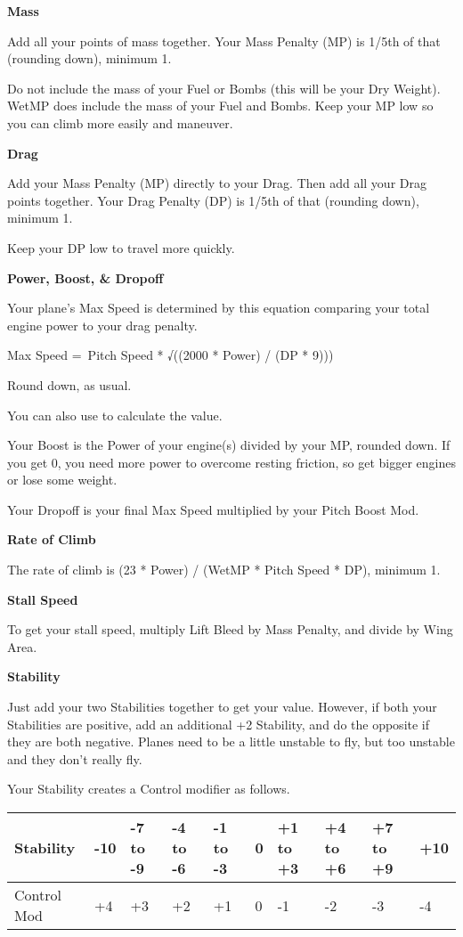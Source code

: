 \documentclass{article}
\begin{document}
\textbf{Mass}

Add all your points of mass together. Your Mass Penalty (MP) is
1/5th of that (rounding down), minimum 1.

Do not include the mass of your Fuel or Bombs (this will be your
Dry Weight). WetMP does include the mass of your Fuel and Bombs.
Keep your MP low so you can climb more easily and maneuver.

\textbf{Drag}

Add your Mass Penalty (MP) directly to your Drag. Then add all
your Drag points together. Your Drag Penalty (DP) is 1/5th of that
(rounding down), minimum 1.

Keep your DP low to travel more quickly.

\textbf{Power, Boost, \& Dropoff}

Your plane's Max Speed is determined by this equation comparing
your total engine power to your drag penalty.

Max Speed =~Pitch Speed * √((2000 * Power) / (DP * 9)))

Round down, as usual.

You can also use to calculate the value.

Your Boost is the Power of your engine(s) divided by your MP,
rounded down. If you get 0, you need more power to overcome resting
friction, so get bigger engines or lose some weight.

Your Dropoff is your final Max Speed multiplied by your Pitch
Boost Mod.

\textbf{Rate of Climb}

The rate of climb is (23 * Power) / (WetMP * Pitch Speed * DP),
minimum 1.

\textbf{Stall Speed}

To get your stall speed, multiply Lift Bleed by Mass Penalty, and
divide by Wing Area.

\textbf{Stability}

Just add your two Stabilities together to get your value.
However, if both your Stabilities are positive, add an additional +2
Stability, and do the opposite if they are both negative. Planes need to
be a little unstable to fly, but too unstable and they don't really
fly.

Your Stability creates a Control modifier as follows.

\begin{tabular}{|l|l|l|l|l|l|l|l|l|l|}
  \hline
  Stability   & -10      & -7 to -9 & -4 to -6 & -1 to -3 & 0 & +1 to +3 & +4 to
  +6          & +7 to +9 & +10                                                             \\\hline
  Control Mod & +4       & +3       & +2       & +1       & 0 & -1       & -2    & -3 & -4 \\\hline
\end{tabular}
\end{document}
